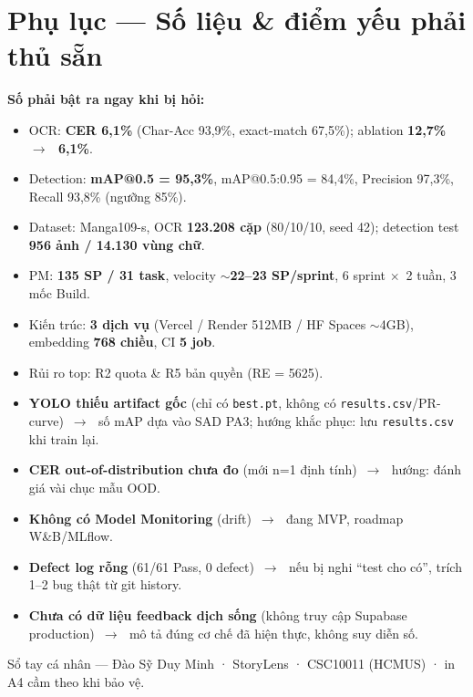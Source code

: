 \documentclass[11pt]{article}
\newcommand{\arr}{\,\ensuremath{\rightarrow}\,}
\newcommand{\x}{\ensuremath{\times}}
\newcommand{\code}[1]{\texttt{\small #1}}
\begin{document}
\section{Phụ lục --- Số liệu \& điểm yếu phải thủ sẵn}

\begin{sohoc}
\textbf{Số phải bật ra ngay khi bị hỏi:}
\begin{itemize}
  \item OCR: \textbf{CER 6,1\%} (Char-Acc 93,9\%, exact-match 67,5\%); ablation \textbf{12,7\% \arr\ 6,1\%}.
  \item Detection: \textbf{mAP@0.5 = 95,3\%}, mAP@0.5:0.95 = 84,4\%, Precision 97,3\%, Recall 93,8\% (ngưỡng 85\%).
  \item Dataset: Manga109-s, OCR \textbf{123.208 cặp} (80/10/10, seed 42); detection test \textbf{956 ảnh / 14.130 vùng chữ}.
  \item PM: \textbf{135 SP / 31 task}, velocity \textbf{$\sim$22--23 SP/sprint}, 6 sprint \x\ 2 tuần, 3 mốc Build.
  \item Kiến trúc: \textbf{3 dịch vụ} (Vercel / Render 512MB / HF Spaces $\sim$4GB), embedding \textbf{768 chiều}, CI \textbf{5 job}.
  \item Rủi ro top: R2 quota \& R5 bản quyền (RE = 5625).
\end{itemize}
\end{sohoc}

\begin{tcolorbox}[breakable,enhanced,sharp corners,boxrule=0.8pt,colframe=leaf,colback=leaf!5,
  coltitle=white,colbacktitle=leaf,fonttitle=\bfseries\headfont\small,
  title={Điểm yếu phải thừa nhận trung thực (kèm định hướng) --- đừng để reviewer bắt trước}]
\begin{itemize}
  \item \textbf{YOLO thiếu artifact gốc} (chỉ có \code{best.pt}, không có \code{results.csv}/PR-curve) \arr\ số mAP dựa vào SAD PA3; hướng khắc phục: lưu \code{results.csv} khi train lại.
  \item \textbf{CER out-of-distribution chưa đo} (mới n=1 định tính) \arr\ hướng: đánh giá vài chục mẫu OOD.
  \item \textbf{Không có Model Monitoring} (drift) \arr\ đang MVP, roadmap W\&B/MLflow.
  \item \textbf{Defect log rỗng} (61/61 Pass, 0 defect) \arr\ nếu bị nghi ``test cho có'', trích 1--2 bug thật từ git history.
  \item \textbf{Chưa có dữ liệu feedback dịch sống} (không truy cập Supabase production) \arr\ mô tả đúng cơ chế đã hiện thực, không suy diễn số.
\end{itemize}
\end{tcolorbox}

\vspace{6pt}
\begin{center}\small\color{soft}
Sổ tay cá nhân --- Đào Sỹ Duy Minh · StoryLens · CSC10011 (HCMUS) · in A4 cầm theo khi bảo vệ.
\end{center}
\end{document}
